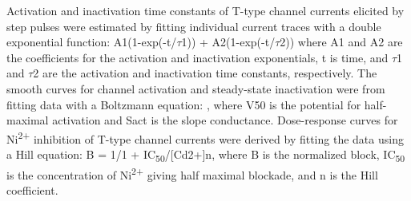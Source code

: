 Activation and inactivation time constants of T-type channel currents elicited by step pulses were estimated by fitting individual current traces with a double exponential function: A1(1-exp(-t/$\tau$1)) + A2(1-exp(-t/$\tau$2)) where A1 and A2 are the coefficients for the activation and inactivation exponentials, t is time, and $\tau$1 and $\tau$2 are the activation and inactivation time constants, respectively.
The smooth curves for channel activation and steady-state inactivation were from fitting data with a Boltzmann equation: , where V50 is the potential for half-maximal activation and Sact is the slope conductance.
Dose-response curves for Ni\textsuperscript{2+} inhibition of T-type channel currents were derived by fitting the data using a Hill equation: B = 1/{1 + IC\textsubscript{50}/[Cd2+]n}, where B is the normalized block, IC\textsubscript{50} is the concentration of Ni\textsuperscript{2+} giving half maximal blockade, and n is the Hill coefficient.
    
  